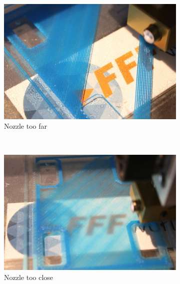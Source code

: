 \documentclass[11pt,a4paper]{article}
\begin{document}
\begin{figure}[H]
    \centering
    \begin{subfigure}[b]{0.3\textwidth}
        \includegraphics[width=\textwidth,cfbox=azul_marcos 3pt 0pt]{FOTOS/HOTENDALTO}
	\caption*{Nozzle too far}
    \end{subfigure}
    ~ %
    \begin{subfigure}[b]{0.3\textwidth}
        \includegraphics[width=\textwidth,cfbox=azul_marcos 3pt 0pt]{FOTOS/HOTENDBAJO}
	\caption*{Nozzle too close}
    \end{subfigure}
    ~ %
    \begin{subfigure}[b]{0.3\textwidth}

\end{subfigure}
\end{figure}
\end{document}
